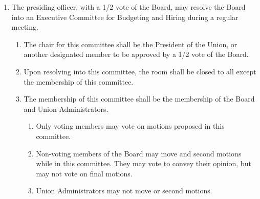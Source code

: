 \documentclass{uniondoc}
\begin{document}
\begin{enumerate}
\begin{enumerate}
\begin{enumerate}
    \end{enumerate}
  \item It shall promote cohesion between the Executive Board and other Union bodies.
    \begin{enumerate}
    \item It shall be the responsibility of the chairpersons, or designated representative, of each Executive Board committee to correspond with both the ExComm chairperson and the President of the Union on all publicity information.
    \item The Director of Public Relations of the Undergraduate Council, a designee of the Graduate Council, and the chairperson of the Judicial Board may correspond with ExComm and its chairperson if they wish to use the resources and platforms of the committee to promote the information and initiatives of their respective bodies.
    \item The Chair of ExComm and their equivalents on the Student Senate, Judicial Board, Undergraduate Council, and Graduate Council, or a designee if there is no such equivalent, shall meet at least monthly during the academic year to ensure cohesion between different Union bodies in their communications and messaging.
    \end{enumerate}
  \end{enumerate}
\item The presiding officer, with a 1/2 vote of the Board, may resolve the Board into an Executive Committee for Budgeting and Hiring during a regular meeting.
  \begin{enumerate}
  \item The chair for this committee shall be the President of the Union, or another designated member to be approved by a 1/2 vote of the Board.
  \item Upon resolving into this committee, the room shall be closed to all except the membership of this committee.
  \item The membership of this committee shall be the membership of the Board and Union Administrators.
    \begin{enumerate}
    \item Only voting members may vote on motions proposed in this committee.
    \item Non-voting members of the Board may move and second motions while in this committee. They may vote to convey their opinion, but may not vote on final motions.
    \item Union Administrators may not move or second motions.

\end{enumerate}
\end{enumerate}
\end{enumerate}
\end{document}
